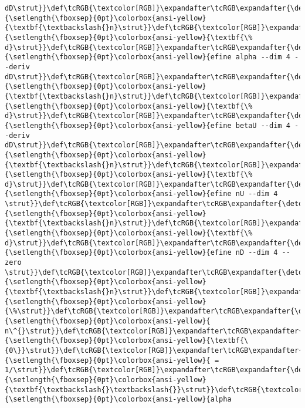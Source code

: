 \documentclass[landscape,letterpaper,10pt,english]{article}
\begin{document}
\begin{Verbatim}[commandchars=\\\{\}, frame=single, framerule=2mm, rulecolor=\color{outerrorbackground}]
dD\strut}}\def\tcRGB{\textcolor[RGB]}\expandafter\tcRGB\expandafter{\detokenize{175,95,0}}{\setlength{\fboxsep}{0pt}\colorbox{ansi-yellow}{\textbf{\textbackslash{}n}\strut}}\def\tcRGB{\textcolor[RGB]}\expandafter\tcRGB\expandafter{\detokenize{175,95,135}}{\setlength{\fboxsep}{0pt}\colorbox{ansi-yellow}{\textbf{\% d}\strut}}\def\tcRGB{\textcolor[RGB]}\expandafter\tcRGB\expandafter{\detokenize{175,0,0}}{\setlength{\fboxsep}{0pt}\colorbox{ansi-yellow}{efine alpha --dim 4 --deriv dD\strut}}\def\tcRGB{\textcolor[RGB]}\expandafter\tcRGB\expandafter{\detokenize{175,95,0}}{\setlength{\fboxsep}{0pt}\colorbox{ansi-yellow}{\textbf{\textbackslash{}n}\strut}}\def\tcRGB{\textcolor[RGB]}\expandafter\tcRGB\expandafter{\detokenize{175,95,135}}{\setlength{\fboxsep}{0pt}\colorbox{ansi-yellow}{\textbf{\% d}\strut}}\def\tcRGB{\textcolor[RGB]}\expandafter\tcRGB\expandafter{\detokenize{175,0,0}}{\setlength{\fboxsep}{0pt}\colorbox{ansi-yellow}{efine betaU --dim 4 --deriv dD\strut}}\def\tcRGB{\textcolor[RGB]}\expandafter\tcRGB\expandafter{\detokenize{175,95,0}}{\setlength{\fboxsep}{0pt}\colorbox{ansi-yellow}{\textbf{\textbackslash{}n}\strut}}\def\tcRGB{\textcolor[RGB]}\expandafter\tcRGB\expandafter{\detokenize{175,95,135}}{\setlength{\fboxsep}{0pt}\colorbox{ansi-yellow}{\textbf{\% d}\strut}}\def\tcRGB{\textcolor[RGB]}\expandafter\tcRGB\expandafter{\detokenize{175,0,0}}{\setlength{\fboxsep}{0pt}\colorbox{ansi-yellow}{efine nU --dim 4 \strut}}\def\tcRGB{\textcolor[RGB]}\expandafter\tcRGB\expandafter{\detokenize{175,95,0}}{\setlength{\fboxsep}{0pt}\colorbox{ansi-yellow}{\textbf{\textbackslash{}n}\strut}}\def\tcRGB{\textcolor[RGB]}\expandafter\tcRGB\expandafter{\detokenize{175,95,135}}{\setlength{\fboxsep}{0pt}\colorbox{ansi-yellow}{\textbf{\% d}\strut}}\def\tcRGB{\textcolor[RGB]}\expandafter\tcRGB\expandafter{\detokenize{175,0,0}}{\setlength{\fboxsep}{0pt}\colorbox{ansi-yellow}{efine nD --dim 4 --zero \strut}}\def\tcRGB{\textcolor[RGB]}\expandafter\tcRGB\expandafter{\detokenize{175,95,0}}{\setlength{\fboxsep}{0pt}\colorbox{ansi-yellow}{\textbf{\textbackslash{}n}\strut}}\def\tcRGB{\textcolor[RGB]}\expandafter\tcRGB\expandafter{\detokenize{175,0,0}}{\setlength{\fboxsep}{0pt}\colorbox{ansi-yellow}{\%\strut}}\def\tcRGB{\textcolor[RGB]}\expandafter\tcRGB\expandafter{\detokenize{175,0,0}}{\setlength{\fboxsep}{0pt}\colorbox{ansi-yellow}{  n\^{}\strut}}\def\tcRGB{\textcolor[RGB]}\expandafter\tcRGB\expandafter{\detokenize{175,95,135}}{\setlength{\fboxsep}{0pt}\colorbox{ansi-yellow}{\textbf{\{0\}}\strut}}\def\tcRGB{\textcolor[RGB]}\expandafter\tcRGB\expandafter{\detokenize{175,0,0}}{\setlength{\fboxsep}{0pt}\colorbox{ansi-yellow}{ = 1/\strut}}\def\tcRGB{\textcolor[RGB]}\expandafter\tcRGB\expandafter{\detokenize{175,95,0}}{\setlength{\fboxsep}{0pt}\colorbox{ansi-yellow}{\textbf{\textbackslash{}\textbackslash{}}\strut}}\def\tcRGB{\textcolor[RGB]}\expandafter\tcRGB\expandafter{\detokenize{175,0,0}}{\setlength{\fboxsep}{0pt}\colorbox{ansi-yellow}{alpha 
\end{Verbatim}
\end{document}
